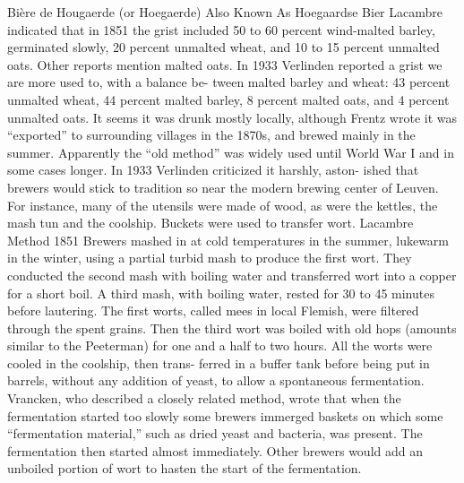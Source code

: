 \documentclass[a4paper,parskip=half]{scrartcl}
\begin{document}
Bière de Hougaerde (or Hoegaerde)
Also Known As Hoegaardse Bier
Lacambre indicated that in 1851 the grist included 50 to 60 percent
wind-malted barley, germinated slowly, 20 percent unmalted wheat, and
10 to 15 percent unmalted oats. Other reports mention malted oats. In
1933 Verlinden reported a grist we are more used to, with a balance be-
tween malted barley and wheat: 43 percent unmalted wheat, 44 percent
malted barley, 8 percent malted oats, and 4 percent unmalted oats.
It seems it was drunk mostly locally, although Frentz wrote it was
“exported” to surrounding villages in the 1870s, and brewed mainly in
the summer.
Apparently the “old method” was widely used until World War I
and in some cases longer. In 1933 Verlinden criticized it harshly, aston-
ished that brewers would stick to tradition so near the modern brewing
center of Leuven. For instance, many of the utensils were made of wood,
as were the kettles, the mash tun and the coolship. Buckets were used to
transfer wort.
Lacambre Method
1851
Brewers mashed in at cold temperatures in the summer, lukewarm in
the winter, using a partial turbid mash to produce the first wort. They
conducted the second mash with boiling water and transferred wort into
a copper for a short boil. A third mash, with boiling water, rested for
30 to 45 minutes before lautering. The first worts, called mees in local
Flemish, were filtered through the spent grains. Then the third wort was
boiled with old hops (amounts similar to the Peeterman) for one and a
half to two hours. All the worts were cooled in the coolship, then trans-
ferred in a buffer tank before being put in barrels, without any addition
of yeast, to allow a spontaneous fermentation.
Vrancken, who described a closely related method, wrote that when
the fermentation started too slowly some brewers immerged baskets on
which some “fermentation material,” such as dried yeast and bacteria,
was present. The fermentation then started almost immediately. Other
brewers would add an unboiled portion of wort to hasten the start of
the fermentation.
\end{document}

